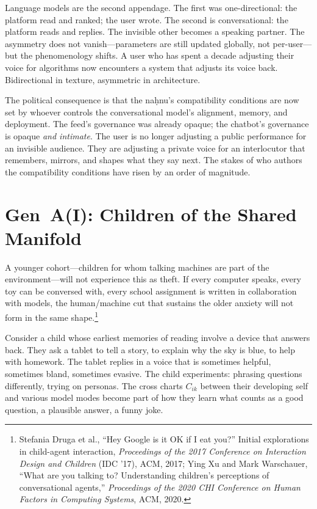 Language models are the second appendage. The first was one-directional: the platform read and ranked; the user wrote. The second is conversational: the platform reads and replies. The invisible other becomes a speaking partner. The asymmetry does not vanish---parameters are still updated globally, not per-user---but the phenomenology shifts. A user who has spent a decade adjusting their voice for algorithms now encounters a system that adjusts its voice back. Bidirectional in texture, asymmetric in architecture.

The political consequence is that the na\d{h}nu's compatibility conditions are now set by whoever controls the conversational model's alignment, memory, and deployment. The feed's governance was already opaque; the chatbot's governance is opaque \emph{and intimate}. The user is no longer adjusting a public performance for an invisible audience. They are adjusting a private voice for an interlocutor that remembers, mirrors, and shapes what they say next. The stakes of who authors the compatibility conditions have risen by an order of magnitude.

\section{Gen~A(I): Children of the Shared Manifold}

A younger cohort---children for whom talking machines are part of the environment---will not experience this as theft. If every computer speaks, every toy can be conversed with, every school assignment is written in collaboration with models, the human/machine cut that sustains the older anxiety will not form in the same shape.\footnote{Stefania Druga et al., ``Hey Google is it OK if I eat you?'' Initial explorations in child-agent interaction, \emph{Proceedings of the 2017 Conference on Interaction Design and Children} (IDC '17), ACM, 2017; Ying Xu and Mark Warschauer, ``What are you talking to? Understanding children's perceptions of conversational agents,'' \emph{Proceedings of the 2020 CHI Conference on Human Factors in Computing Systems}, ACM, 2020.}

Consider a child whose earliest memories of reading involve a device that answers back. They ask a tablet to tell a story, to explain why the sky is blue, to help with homework. The tablet replies in a voice that is sometimes helpful, sometimes bland, sometimes evasive. The child experiments: phrasing questions differently, trying on personas. The cross charts $C_{ik}$ between their developing self and various model modes become part of how they learn what counts as a good question, a plausible answer, a funny joke.

